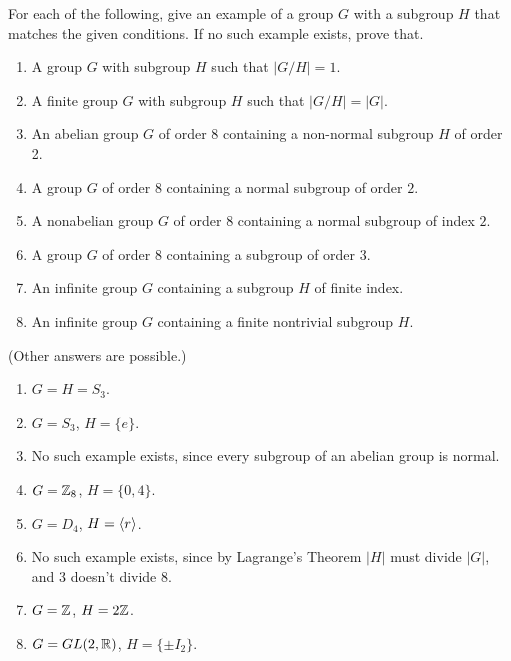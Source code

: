 \begin{exercise}
For each of the following, give an example of a group $G$ with a subgroup $H$ that matches the given conditions.  If no such example exists, prove that.

\begin{enumerate}
\item A group $G$ with subgroup $H$ such that $|G/H|=1$.
\item A finite group $G$ with subgroup $H$ such that $|G/H|=|G|$.
\item An abelian group $G$ of order $8$ containing a non-normal subgroup $H$ of order 2.
\item A group $G$ of order 8 containing a normal subgroup of order $2$.
\item A nonabelian group $G$ of order 8 containing a normal subgroup of index $2$.
\item A group $G$ of order 8 containing a subgroup of order $3$.
\item An infinite group $G$ containing a subgroup $H$ of finite index.
\item An infinite group $G$ containing a finite nontrivial subgroup $H$.
\end{enumerate}
\end{exercise}

\begin{solution}[print=false]
(Other answers are possible.)

\begin{enumerate}
\item $G=H=S_3$.
\item $G=S_3$, $H=\{e\}$.
\item No such example exists, since every subgroup of an abelian group is normal.
\item $G=\mathbb{Z}_8$, $H=\{0,4\}$.
\item $G=D_4$, $H=\langle r\rangle$.
\item No such example exists, since by Lagrange's Theorem $|H|$ must divide $|G|$, and 3 doesn't divide 8.
\item $G=\mathbb{Z}$, $H=2\mathbb{Z}$.
\item $G=GL(2,\mathbb{R})$, $H=\{\pm I_2\}$.
\end{enumerate}
\end{solution}

